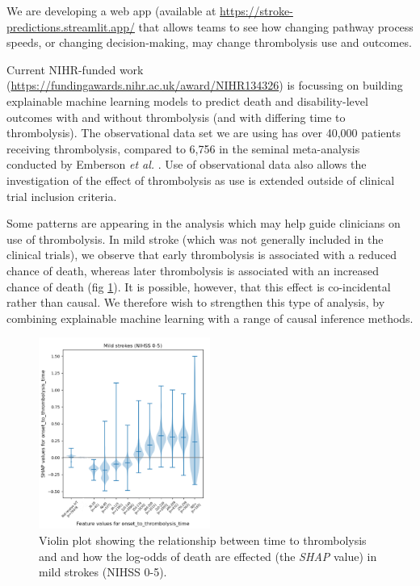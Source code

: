 We are developing a web app (available at \url{https://stroke-predictions.streamlit.app/} that allows teams to see how changing pathway process speeds, or changing decision-making, may change thrombolysis use and outcomes.



Current NIHR-funded work (\url{https://fundingawards.nihr.ac.uk/award/NIHR134326}) is focussing on building explainable machine learning models to predict death and disability-level outcomes with and without thrombolysis (and with differing time to thrombolysis). The observational data set we are using has over 40,000 patients receiving thrombolysis, compared to 6,756 in the seminal meta-analysis conducted by Emberson \textit{et al.} \cite{emberson_effect_2014}. Use of observational data also allows the investigation of the effect of thrombolysis as use is extended outside of clinical trial inclusion criteria. 

Some patterns are appearing in the analysis which may help guide clinicians on use of thrombolysis. In mild stroke (which was not generally included in the clinical trials), we observe that early thrombolysis is associated with a reduced chance of death, whereas later thrombolysis is associated with an increased chance of death (fig \ref{fig:death}). It is possible, however, that this effect is co-incidental rather than causal. We therefore wish to strengthen this type of analysis, by combining explainable machine learning with a range of causal inference methods.

\begin{figure}
\centering
\includegraphics[width=0.5\textwidth]{./images/death}
\caption{Violin plot showing the relationship between time to thrombolysis and and how the log-odds of death are effected (the \textit{SHAP} value) in mild strokes (NIHSS 0-5).}
\label{fig:death}
\end{figure}


